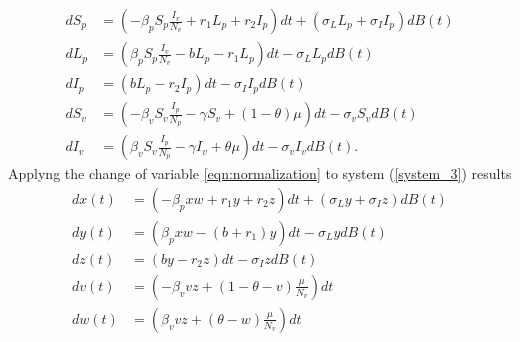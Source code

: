\begin{equation}
	\label{system_3}
	\begin{aligned}
		d S_p &=
			\left(
				-\beta_p S_p \frac{I_v}{N_v} + r_1 L_p + r_2 I_p
			\right)dt 
			+ (\sigma_L L_p
			+ 
			\sigma_I I_p)dB(t) 
		\\
		dL_p &=
			\left(
				\beta_p S_p \frac{I_v}{N_v} - b L_p - r_1 L_p
			\right) dt 
			- \sigma_L L_p dB(t) 
		\\
		d I_p &=
			\left(
				b L_p - r_2 I_p
			\right) dt 
			- \sigma_I I_p dB(t) 
		\\
		dS_v &=
			\left(
				-\beta_v S_v \frac{I_p}{N_p} - \gamma S_v  + (1-\theta) \mu
			\right)dt - \sigma_v S_v dB(t) 
		\\
		d I_v &=
			\left(
				\beta_v S_v \frac{I_p}{N_p} -\gamma I_v + \theta \mu
			\right) dt 
			- \sigma_v I_v dB(t).
	\end{aligned}
\end{equation}
Applyng the change of variable \eqref{eqn:normalization} to system (\ref{system_3}) results
\begin{equation}
	\begin{aligned}
	\label{system_4}
		d x(t) &=
			(-\beta_p x w + r_1 y + r_2 z) dt 
			+ (\sigma_L y + \sigma_I z) dB(t) 
		\\
		dy(t) &=
			(\beta_p x w - (b + r_1) y) dt 
			- \sigma_L y dB(t)
		\\
		dz(t) &=
			(b y - r_2 z) dt -\sigma_I z dB(t)
		\\
		dv(t) &=
			\left(
				-\beta_v v z + (1-\theta-v) 
				\frac{\mu}{N_v}
			\right) dt 
		\\
		dw(t) &=
			\left(
				\beta_v v z 
				+ (\theta-w) \frac{\mu}{N_v}
			\right) dt
	\end{aligned}
\end{equation}
